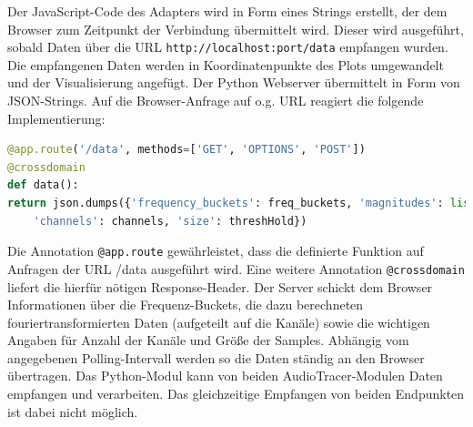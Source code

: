 Der JavaScript-Code des Adapters wird in Form eines Strings erstellt, der dem Browser zum Zeitpunkt der Verbindung übermittelt wird. Dieser wird ausgeführt, sobald Daten über die URL \texttt{http://localhost:{port}/data} empfangen wurden. Die empfangenen Daten werden in Koordinatenpunkte des Plots umgewandelt und der Visualisierung angefügt.
Der Python Webserver übermittelt in Form von JSON-Strings. Auf die Browser-Anfrage auf  o.g. URL reagiert die folgende Implementierung:

\begin{lstlisting}[language=Python, frame=none, numbers=none]
@app.route('/data', methods=['GET', 'OPTIONS', 'POST'])
@crossdomain
def data():
return json.dumps({'frequency_buckets': freq_buckets, 'magnitudes': list(magnitudeHolder),
	'channels': channels, 'size': threshHold})
\end{lstlisting}

Die Annotation \texttt{@app.route} gewährleistet, dass die definierte Funktion auf Anfragen der URL /data ausgeführt wird. Eine weitere Annotation \texttt{@crossdomain} liefert die hierfür nötigen Response-Header. Der Server schickt dem Browser Informationen über die Frequenz-Buckets, die dazu berechneten fouriertransformierten Daten (aufgeteilt auf die Kanäle) sowie die wichtigen Angaben für Anzahl der Kanäle und Größe der Samples.
Abhängig vom angegebenen Polling-Intervall werden so die Daten ständig an den Browser übertragen. Das Python-Modul kann von beiden AudioTracer-Modulen Daten empfangen und verarbeiten. Das gleichzeitige Empfangen von beiden Endpunkten ist dabei nicht möglich.


